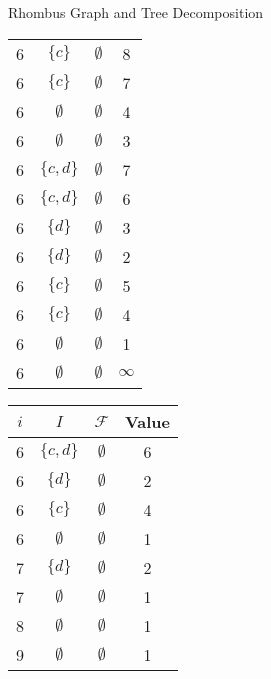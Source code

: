 \documentclass{beamer}
\begin{document}
\begin{frame}{Rhombus Graph and Tree Decomposition}
\begin{minipage}{0.35\textwidth}
\begin{tabular}{|c| >{\small}c | >{\small}c | >{\small}c |}
    6 & \( \{ c \} \) & \( \emptyset \) & 8 \\
    6 & \( \{ c \} \) & \( \emptyset \) & 7 \\
    6 & \( \emptyset \) & \( \emptyset \) & 4 \\
    6 & \( \emptyset \) & \( \emptyset \) & 3 \\
    
    6 & \( \{ c, d \} \) & \( \emptyset \) & 7 \\
    6 & \( \{ c, d \} \) & \( \emptyset \) & 6 \\
    6 & \( \{ d \} \) & \( \emptyset \) & 3 \\
    6 & \( \{ d \} \) & \( \emptyset \) & 2 \\

    6 & \( \{ c \} \) & \( \emptyset \) & 5 \\
    6 & \( \{ c \} \) & \( \emptyset \) & 4 \\
    6 & \( \emptyset \) & \( \emptyset \) & 1 \\
    6 & \( \emptyset \) & \( \emptyset \) & \( \infty \) \\

    \hline
    \end{tabular}
  \end{minipage}
  \begin{minipage}{0.1\textwidth}
    \centering
    \renewcommand{\arraystretch}{0.5} 
    \setlength{\tabcolsep}{0.7pt} 
    \begin{tabular}{|c| >{\small}c | >{\small}c | >{\small}c |}
    \hline
    \textbf{\(i\)} & \textbf{\(I\)} & \textbf{\(\mathcal{F}\)} & \textbf{Value} \\
    \hline
    6 & \( \{ c, d \} \) & \( \emptyset \) & 6 \\
    6 & \( \{ d \} \) & \( \emptyset \) & 2 \\
    6 & \( \{ c \} \) & \( \emptyset \) & 4 \\
    6 & \( \emptyset \) & \( \emptyset \) & 1 \\
    \hline
    7 & \( \{ d \} \) & \( \emptyset \) & 2 \\
    7 & \( \emptyset \) & \( \emptyset \) & 1 \\
    \hline
    8 & \( \emptyset \) & \( \emptyset \) & 1 \\
    \hline
    9 & \( \emptyset \) & \( \emptyset \) & 1 \\
    \hline
    \end{tabular}
  \end{minipage}
\end{frame}
\end{document}

